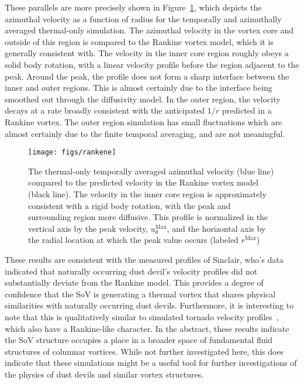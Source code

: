 These parallels are more precisely shown in
Figure~\ref{fig:rankine}, which depicts the azimuthal velocity as a
function of radius for the temporally and azimuthally averaged
thermal-only simulation. The azimuthal velocity in the vortex
core and outside of this region is compared to the Rankine
vortex model, which it is generally consistent with. 
The velocity in the inner core
region roughly obeys a solid body rotation, with a linear velocity
profile before the region adjacent to the peak. Around the peak, the
profile does not form a sharp interface between the inner and outer
regions. This is almost certainly due to the interface being smoothed
out through the diffusivity model. In the outer region, the velocity
decays at a rate broadly consistent with the anticipated $1/r$ predicted
in a Rankine vortex.  The outer region simulation has small fluctuations
which are almost certainly due to the finite temporal averaging, and are
not meaningful.  

\begin{figure}[htb]
\centering
 \texttt{[image: figs/rankene]}
 \caption{The thermal-only temporally averaged azimuthal velocity (blue
 line) compared to the predicted 
 velocity in the Rankine vortex model (black line). The velocity in the
 inner core region is approximately consistent with a rigid body
 rotation, with the peak and surrounding region more diffusive. 
 This profile is normalized in the vertical 
 axis by the peak velocity, $u_{\theta}^{\text{Max}}$, and the 
 horizontal axis by the radial location at which the peak value occurs 
 (labeled $r^{\text{Max}}$)} 
 \label{fig:rankine}  
\end{figure}

These results are consistent with the measured profiles of Sinclair,
who's data indicated that naturally occurring dust devil's velocity
profiles did not substantially deviate from the Rankine model. 
This provides a degree of confidence that the SoV is generating a
thermal vortex that shares physical similarities with naturally
occurring dust devils. Furthermore, it is interesting to note that this
is qualitatively similar to simulated tornado velocity
profiles~\cite{nolan1999structure}, which also have a Rankine-like
character. In the abstract, these results indicate 
the SoV structure occupies a place in a broader space of fundamental 
fluid structures of columnar vortices. While not further investigated
here, this does indicate that these simulations might be a useful tool
for further investigations of the physics of dust devils and similar 
vortex structures. 


